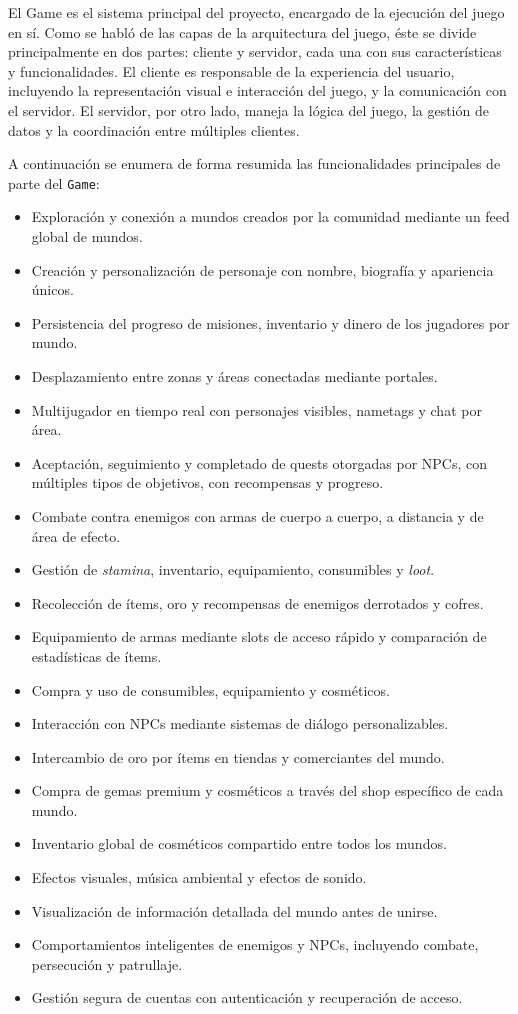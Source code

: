 El Game es el sistema principal del proyecto, encargado de la ejecución del juego en sí. 
Como se habló de las capas de la arquitectura del juego, éste se divide principalmente en dos partes: 
cliente y servidor, cada una con sus características y funcionalidades. El cliente es responsable de la 
experiencia del usuario, incluyendo la representación visual e interacción del juego, y la comunicación con el 
servidor. El servidor, por otro lado, maneja la lógica del juego, la gestión de datos y la coordinación 
entre múltiples clientes.

\vspace{0.25cm}

A continuación se enumera de forma resumida las funcionalidades principales de parte del \texttt{Game}:

\begin{itemize}
  \item Exploración y conexión a mundos creados por la comunidad mediante un feed global de mundos.
  \item Creación y personalización de personaje con nombre, biografía y apariencia únicos.
  \item Persistencia del progreso de misiones, inventario y dinero de los jugadores por mundo.
  \item Desplazamiento entre zonas y áreas conectadas mediante portales.
  \item Multijugador en tiempo real con personajes visibles, nametags y chat por área.
  \item Aceptación, seguimiento y completado de quests otorgadas por NPCs, con múltiples tipos de objetivos, con recompensas y progreso.
  \item Combate contra enemigos con armas de cuerpo a cuerpo, a distancia y de área de efecto.
  \item Gestión de \textit{stamina}, inventario, equipamiento, consumibles y \textit{loot}.
  \item Recolección de ítems, oro y recompensas de enemigos derrotados y cofres.
  \item Equipamiento de armas mediante slots de acceso rápido y comparación de estadísticas de ítems.
  \item Compra y uso de consumibles, equipamiento y cosméticos.
  \item Interacción con NPCs mediante sistemas de diálogo personalizables.
  \item Intercambio de oro por ítems en tiendas y comerciantes del mundo.
  \item Compra de gemas premium y cosméticos a través del shop específico de cada mundo.
  \item Inventario global de cosméticos compartido entre todos los mundos.
  \item Efectos visuales, música ambiental y efectos de sonido.
  \item Visualización de información detallada del mundo antes de unirse.
  \item Comportamientos inteligentes de enemigos y NPCs, incluyendo combate, persecución y patrullaje.
  \item Gestión segura de cuentas con autenticación y recuperación de acceso.
\end{itemize}
